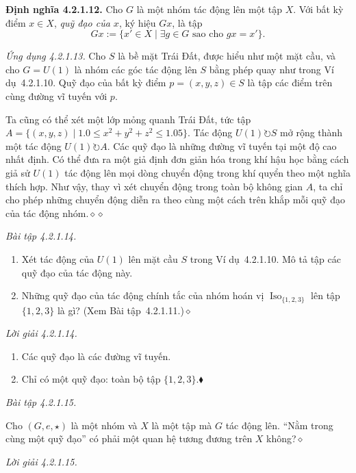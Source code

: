 \noindent\textbf{Định nghĩa 4.2.1.12.} Cho $G$ là một nhóm tác động lên một tập $X$. Với bất kỳ điểm $x\in X$, \emph{quỹ đạo của $x$}, ký hiệu $Gx$, là tập
\[
Gx:=\{x'\in X\mid\exists g\in G\text{ sao cho }gx=x'\}.
\]

\noindent\textit{Ứng dụng 4.2.1.13.} Cho $S$ là bề mặt Trái Đất, được hiểu như một mặt cầu, và cho $G=U(1)$ là nhóm các góc tác động lên $S$ bằng phép quay như trong Ví dụ~4.2.1.10. Quỹ đạo của bất kỳ điểm $p=(x,y,z)\in S$ là tập các điểm trên cùng đường vĩ tuyến với $p$.

Ta cũng có thể xét một lớp mỏng quanh Trái Đất, tức tập $A=\{(x,y,z)\mid1.0\le x^2+y^2+z^2\le1.05\}$. Tác động $U(1)\circlearrowright S$ mở rộng thành một tác động $U(1)\circlearrowright A$. Các quỹ đạo là những đường vĩ tuyến tại một độ cao nhất định. Có thể đưa ra một giả định đơn giản hóa trong khí hậu học bằng cách giả sử $U(1)$ tác động lên mọi dòng chuyển động trong khí quyển theo một nghĩa thích hợp. Như vậy, thay vì xét chuyển động trong toàn bộ không gian $A$, ta chỉ cho phép những chuyển động diễn ra theo cùng một cách trên khắp mỗi quỹ đạo của tác động nhóm.\nobreak\hfill$\diamond\diamond$

\noindent\textit{Bài tập 4.2.1.14.}\keepwithnext
\begin{enumerate}[label=\alph*.]
\item Xét tác động của $U(1)$ lên mặt cầu $S$ trong Ví dụ~4.2.1.10. Mô tả tập các quỹ đạo của tác động này.
\item Những quỹ đạo của tác động chính tắc của nhóm hoán vị $\operatorname{Iso}_{\{1,2,3\}}$ lên tập $\{1,2,3\}$ là gì? (Xem Bài tập~4.2.1.11.)\nobreak\hfill$\diamond$
\end{enumerate}

\noindent\textit{Lời giải 4.2.1.14.}\keepwithnext
\begin{enumerate}[label=\alph*.]
\item Các quỹ đạo là các đường vĩ tuyến.
\item Chỉ có một quỹ đạo: toàn bộ tập $\{1,2,3\}$.\nobreak\hfill$\blacklozenge$
\end{enumerate}

\noindent\textit{Bài tập 4.2.1.15.}\keepwithnext

Cho $(G,e,\star)$ là một nhóm và $X$ là một tập mà $G$ tác động lên. ``Nằm trong cùng một quỹ đạo'' có phải một quan hệ tương đương trên $X$ không?\hfill$\diamond$

\noindent\textit{Lời giải 4.2.1.15.}\keepwithnext

